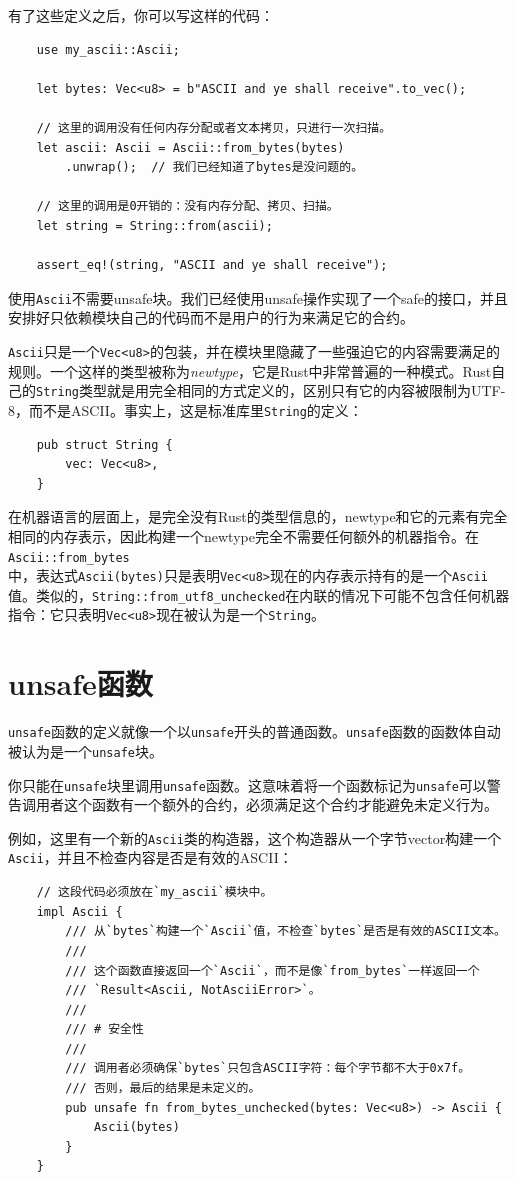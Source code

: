 有了这些定义之后，你可以写这样的代码：
\begin{verbatim}
    use my_ascii::Ascii;

    let bytes: Vec<u8> = b"ASCII and ye shall receive".to_vec();

    // 这里的调用没有任何内存分配或者文本拷贝，只进行一次扫描。
    let ascii: Ascii = Ascii::from_bytes(bytes)
        .unwrap();  // 我们已经知道了bytes是没问题的。

    // 这里的调用是0开销的：没有内存分配、拷贝、扫描。
    let string = String::from(ascii);

    assert_eq!(string, "ASCII and ye shall receive");
\end{verbatim}

使用\texttt{Ascii}不需要unsafe块。我们已经使用unsafe操作实现了一个safe的接口，并且安排好只依赖模块自己的代码而不是用户的行为来满足它的合约。

\texttt{Ascii}只是一个\texttt{Vec<u8>}的包装，并在模块里隐藏了一些强迫它的内容需要满足的规则。一个这样的类型被称为\emph{newtype}，它是Rust中非常普遍的一种模式。Rust自己的\texttt{String}类型就是用完全相同的方式定义的，区别只有它的内容被限制为UTF-8，而不是ASCII。事实上，这是标准库里\texttt{String}的定义：
\begin{verbatim}
    pub struct String {
        vec: Vec<u8>,
    }
\end{verbatim}

在机器语言的层面上，是完全没有Rust的类型信息的，newtype和它的元素有完全相同的内存表示，因此构建一个newtype完全不需要任何额外的机器指令。在\texttt{Ascii::from\_bytes}\\
中，表达式\texttt{Ascii(bytes)}只是表明\texttt{Vec<u8>}现在的内存表示持有的是一个\texttt{Ascii}值。类似的，\texttt{String::from\_utf8\_unchecked}在内联的情况下可能不包含任何机器指令：它只表明\texttt{Vec<u8>}现在被认为是一个\texttt{String}。

\section{unsafe函数}
\texttt{unsafe}函数的定义就像一个以\texttt{unsafe}开头的普通函数。\texttt{unsafe}函数的函数体自动被认为是一个\texttt{unsafe}块。

你只能在\texttt{unsafe}块里调用\texttt{unsafe}函数。这意味着将一个函数标记为\texttt{unsafe}可以警告调用者这个函数有一个额外的合约，必须满足这个合约才能避免未定义行为。

例如，这里有一个新的\texttt{Ascii}类的构造器，这个构造器从一个字节vector构建一个\texttt{Ascii}，并且不检查内容是否是有效的ASCII：
\begin{verbatim}
    // 这段代码必须放在`my_ascii`模块中。
    impl Ascii {
        /// 从`bytes`构建一个`Ascii`值，不检查`bytes`是否是有效的ASCII文本。
        ///
        /// 这个函数直接返回一个`Ascii`，而不是像`from_bytes`一样返回一个
        /// `Result<Ascii, NotAsciiError>`。
        ///
        /// # 安全性
        ///
        /// 调用者必须确保`bytes`只包含ASCII字符：每个字节都不大于0x7f。
        /// 否则，最后的结果是未定义的。
        pub unsafe fn from_bytes_unchecked(bytes: Vec<u8>) -> Ascii {
            Ascii(bytes)
        }
    }
\end{verbatim}

